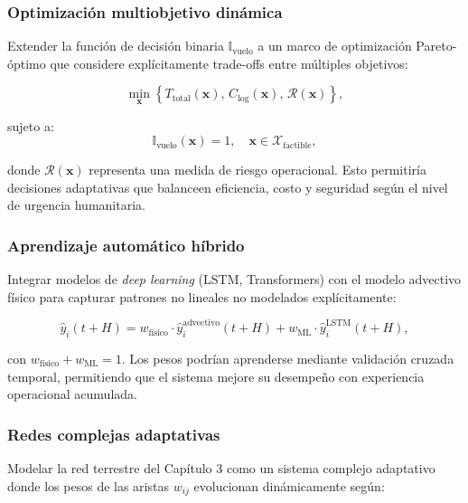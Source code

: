 \documentclass[
  spanish,
  us-letterpaper,
]{scrreprt}
\numberwithin{equation}{section}
\begin{document}
\subsubsection*{Optimización multiobjetivo
dinámica}\label{optimizaciuxf3n-multiobjetivo-dinuxe1mica}

Extender la función de decisión binaria \(\mathbb{I}_{\text{vuelo}}\) a
un marco de optimización Pareto-óptimo que considere explícitamente
trade-offs entre múltiples objetivos:

\[
\min_{\mathbf{x}} \left\{ T_{\text{total}}(\mathbf{x}), \, C_{\text{log}}(\mathbf{x}), \, \mathcal{R}(\mathbf{x}) \right\},
\]

sujeto a: \[
\mathbb{I}_{\text{vuelo}}(\mathbf{x}) = 1, \quad \mathbf{x} \in \mathcal{X}_{\text{factible}},
\]

donde \(\mathcal{R}(\mathbf{x})\) representa una medida de riesgo
operacional. Esto permitiría decisiones adaptativas que balanceen
eficiencia, costo y seguridad según el nivel de urgencia humanitaria.

\subsubsection*{Aprendizaje automático
híbrido}\label{aprendizaje-automuxe1tico-huxedbrido}

Integrar modelos de \emph{deep learning} (LSTM, Transformers) con el
modelo advectivo físico para capturar patrones no lineales no modelados
explícitamente:

\[
\hat{y}_i(t+H) = w_{\text{físico}} \cdot \hat{y}_i^{\text{advectivo}}(t+H) + w_{\text{ML}} \cdot \hat{y}_i^{\text{LSTM}}(t+H),
\]

con \(w_{\text{físico}} + w_{\text{ML}} = 1\). Los pesos podrían
aprenderse mediante validación cruzada temporal, permitiendo que el
sistema mejore su desempeño con experiencia operacional acumulada.

\subsubsection*{Redes complejas
adaptativas}\label{redes-complejas-adaptativas}

Modelar la red terrestre del Capítulo 3 como un sistema complejo
adaptativo donde los pesos de las aristas \(w_{ij}\) evolucionan
dinámicamente según:
\end{document}
